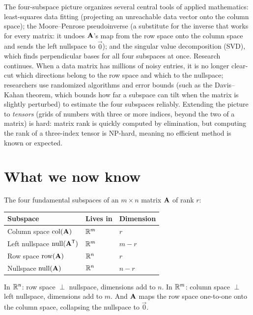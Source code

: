 \begin{historybox}
The four-subspace picture organizes several central tools of applied mathematics: least-squares
data fitting (projecting an unreachable data vector onto the column space); the Moore--Penrose
pseudoinverse (a substitute for the inverse that works for every matrix: it undoes $\mathbf{A}$'s map
from the row space onto the column space and sends the left nullspace to $\vec{0}$); and the
singular value decomposition (SVD), which finds perpendicular bases
for all four subspaces at once. Research continues. When a data matrix has millions of noisy
entries, it is no longer clear-cut which directions belong to the row space and which to the
nullspace; researchers use randomized algorithms and error bounds (such as the Davis--Kahan
theorem, which bounds how far a subspace can tilt when the matrix is slightly perturbed) to
estimate the four subspaces reliably. Extending the picture to \emph{tensors} (grids of numbers
with three or more indices, beyond the two of a matrix) is hard: matrix rank is quickly computed
by elimination, but computing the rank of a three-index tensor is NP-hard, meaning no efficient
method is known or expected.
\end{historybox}

\section{What we now know}

\begin{focusbox}
The four fundamental subspaces of an $m\times n$ matrix $\mathbf{A}$ of rank $r$:
\begin{center}
\begin{tabular}{lll}
\toprule
Subspace & Lives in & Dimension \\
\midrule
Column space $\operatorname{col}(\mathbf{A})$ & $\mathbb{R}^m$ & $r$ \\
Left nullspace $\operatorname{null}(\mathbf{A}^{\mathsf{T}})$ & $\mathbb{R}^m$ & $m-r$ \\
Row space $\operatorname{row}(\mathbf{A})$ & $\mathbb{R}^n$ & $r$ \\
Nullspace $\operatorname{null}(\mathbf{A})$ & $\mathbb{R}^n$ & $n-r$ \\
\bottomrule
\end{tabular}
\end{center}
In $\mathbb{R}^n$: row space $\perp$ nullspace, dimensions add to $n$.
In $\mathbb{R}^m$: column space $\perp$ left nullspace, dimensions add to $m$.
And $\mathbf{A}$ maps the row space one-to-one onto the column space, collapsing the nullspace to
$\vec{0}$.
\end{focusbox}

